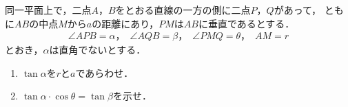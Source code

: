 \documentclass[../../main.tex]{subfiles}
\begin{document}
同一平面上で，二点$A$，$B$をとおる直線の一方の側に二点$P$，$Q$があって，
ともに$AB$の中点$M$から$a$の距離にあり，$PM$は$AB$に垂直であるとする．
\begin{align*}
  \angle APB=\alpha \text{，　} \angle AQB=\beta \text{，　} \angle PMQ=\theta \text{，　} AM=r
\end{align*}
とおき，$\alpha$は直角でないとする．
\begin{enumerate}
  \item $\tan\alpha$を$r$と$a$であらわせ．
  \item $\tan\alpha\cdot\cos\theta=\tan\beta$を示せ．
\end{enumerate}
\end{document}
